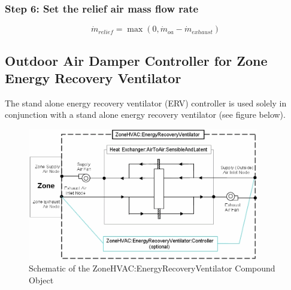 \subsubsection{Step 6: Set the relief air mass flow rate}\label{step-6-Set-the-relief-air-mass-flow-rate}

\begin{equation}
{\dot m_{relief}} = \max (0,{\dot m_{oa}} - {\dot m_{exhaust}})
\end{equation}

\subsection{Outdoor Air Damper Controller for Zone Energy Recovery Ventilator}\label{outdoor-air-damper-controller-for-zone-energy-recovery-ventilator}

The stand alone energy recovery ventilator (ERV) controller is used solely in conjunction with a stand alone energy recovery ventilator (see figure below).

\begin{figure}[hbtp] %
\centering
\includegraphics[width=0.9\textwidth, height=0.9\textheight, keepaspectratio=true]{media/image4482.png}
\caption{Schematic of the ZoneHVAC:EnergyRecoveryVentilator Compound Object \protect \label{fig:schematic-of-the-zonehvac}}
\end{figure}

